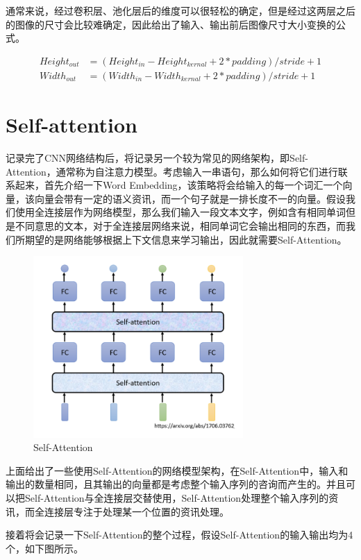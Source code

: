 \documentclass{article}
\begin{document}
\indent 通常来说，经过卷积层、池化层后的维度可以很轻松的确定，但是经过这两层之后的图像的尺寸会比较难确定，因此给出了输入、输出前后图像尺寸大小变换的公式。 \par
\begin{equation}
    \begin{split}
        Height_{out} &= (Height_{in} - Height_{kernal} + 2* padding) / stride + 1\\
        Width_{out}  &= (Width_{in} - Width_{kernal} + 2* padding) / stride + 1
    \end{split}
\end{equation}
\newpage

\section{Self-attention}
\indent 记录完了CNN网络结构后，将记录另一个较为常见的网络架构，即Self-Attention，通常称为自注意力模型。考虑输入一串语句，那么如何将它们进行联系起来，首先介绍一下Word Embedding，该策略将会给输入的每一个词汇一个向量，该向量会带有一定的语义资讯，而一个句子就是一排长度不一的向量。假设我们使用全连接层作为网络模型，那么我们输入一段文本文字，例如含有相同单词但是不同意思的文本，对于全连接层网络来说，相同单词它会输出相同的东西，而我们所期望的是网络能够根据上下文信息来学习输出，因此就需要Self-Attention。  \par

\begin{figure}[H]
    \centering
    \includegraphics[width=8cm]{picture/SelfAttention.png}
    \caption{Self-Attention}
    \label{fig:galxy}
\end{figure}

\indent 上面给出了一些使用Self-Attention的网络模型架构，在Self-Attention中，输入和输出的数量相同，且其输出的向量都是考虑整个输入序列的咨询而产生的。并且可以把Self-Attention与全连接层交替使用，Self-Attention处理整个输入序列的资讯，而全连接层专注于处理某一个位置的资讯处理。 \par
\indent 接着将会记录一下Self-Attention的整个过程，假设Self-Attention的输入输出均为4个，如下图所示。
\end{document}
